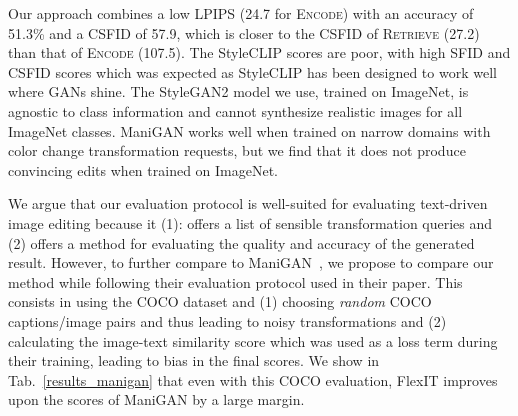 \begin{table}[h!]
\centering
\small
{}
\caption{Evaluation  of \ours and baselines on ImageNet images. %
}
\label{tab1}
\end{table}




Our \ours approach  combines a  low \ac{LPIPS} (24.7  for \textsc{Encode}) with an 
accuracy of 51.3\% and a \ac{CSFID} of 57.9, which is closer to the \ac{CSFID} of
\textsc{Retrieve} (27.2) than that of \textsc{Encode} (107.5).
The StyleCLIP scores are poor, with high \ac{SFID} and \ac{CSFID} scores which was expected as 
StyleCLIP has been designed to work well where GANs shine.
The StyleGAN2 model we use, trained on ImageNet, is agnostic to class information and 
cannot synthesize realistic images for all ImageNet classes.
ManiGAN works well when trained on narrow domains with color change transformation 
requests, but we find that it does not produce convincing edits when trained on 
ImageNet.


We argue that our evaluation protocol is well-suited for evaluating text-driven image editing because it 
(1): offers a list of sensible transformation queries and (2) offers a method for evaluating the quality and accuracy 
of the generated result. However, to further compare to ManiGAN~\citep{li2020manigan}, we propose to compare our method 
while following their 
evaluation protocol used in their paper. This consists in using the COCO dataset and (1) choosing 
\textit{random} COCO captions/image pairs and thus leading to noisy transformations and (2) calculating the image-text similarity
 score which was used as a loss term during their training, leading to bias in the final scores.
 We show 
 in Tab.\ \ref{results_manigan} that even with this COCO evaluation, FlexIT improves upon the scores of ManiGAN by a large margin.

